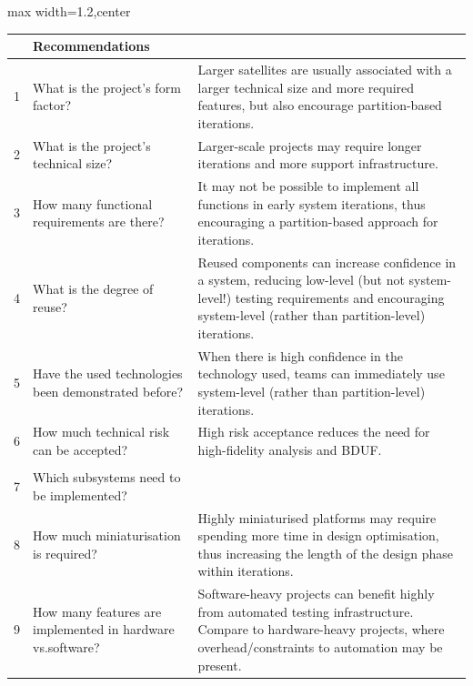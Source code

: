 \documentclass[a4paper,nobib,justified,final]{tufte-book}
\begin{document}
\begin{table}[p]
	\def\arraystretch{1.2}
	\begin{adjustbox}{max width=1.2\textwidth,center}
	\begin{tabularx}{1.2\textwidth}{lp{7cm}>{\small}X}
	\toprule
	\rowcolor{white}
	\multicolumn{2}{l}{\textbf{Project}} & Recommendations\\ \midrule
	1 & What is the project's form factor? & Larger satellites are usually associated with a larger technical size and more required features, but also encourage partition-based iterations. \\
	2 & What is the project's technical size? & Larger-scale projects may require longer iterations and more support infrastructure. \\
	3 & How many functional requirements are there? & It may not be possible to implement all functions in early system iterations, thus encouraging a partition-based approach for iterations. \\
	4 & What is the degree of reuse? & Reused components can increase confidence in a system, reducing low-level (but not system-level!) testing requirements and encouraging system-level (rather than partition-level) iterations. \\
	5 & Have the used technologies been demonstrated before? & When there is high confidence in the technology used, teams can immediately use system-level (rather than partition-level) iterations. \\
	6 & How much technical risk can be accepted? & High risk acceptance reduces the need for high-fidelity analysis and \acl{BDUF}. \\ \midrule
	\rowcolor{white}
	\multicolumn{2}{l}{\textbf{Technical}} &  \\ \midrule
	7 & Which subsystems need to be implemented? &  \\
	8 & How much miniaturisation is required? & Highly miniaturised platforms may require spending more time in design optimisation, thus increasing the length of the design phase within iterations. \\
	9 & How many features are implemented in   hardware vs.\@ software? & Software-heavy projects can benefit highly from automated testing infrastructure. Compare to hardware-heavy projects, where overhead/constraints to automation may be present. \\

\end{tabularx}
\end{adjustbox}
\end{table}
\end{document}
